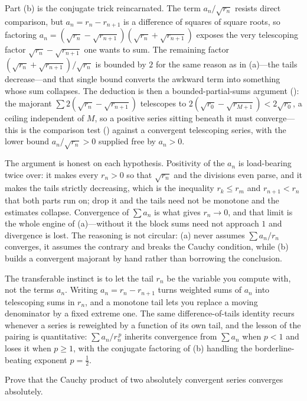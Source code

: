 \documentclass[main.tex]{subfiles}
\begin{document}
\begin{Reflection}
Part (b) is the conjugate trick reincarnated. The term $a_n/\sqrt{r_n}$ resists direct comparison, but
$a_n=r_n-r_{n+1}$ is a difference of squares of square roots, so factoring
$a_n=(\sqrt{r_n}-\sqrt{r_{n+1}})(\sqrt{r_n}+\sqrt{r_{n+1}})$ exposes the very telescoping factor
$\sqrt{r_n}-\sqrt{r_{n+1}}$ one wants to sum. The remaining factor
$(\sqrt{r_n}+\sqrt{r_{n+1}})/\sqrt{r_n}$ is bounded by $2$ for the same reason as in (a)---the tails
decrease---and that single bound converts the awkward term into something whose sum collapses. The
deduction is then a bounded-partial-sums argument (): the majorant
$\sum 2(\sqrt{r_n}-\sqrt{r_{n+1}})$ telescopes to $2(\sqrt{r_0}-\sqrt{r_{M+1}})<2\sqrt{r_0}$, a ceiling
independent of $M$, so a positive series sitting beneath it must converge---this is the comparison test
() against a convergent telescoping series, with the lower bound $a_n/\sqrt{r_n}>0$
supplied free by $a_n>0$.

The argument is honest on each hypothesis. Positivity of the $a_n$ is load-bearing twice over: it makes
every $r_n>0$ so that $\sqrt{r_n}$ and the divisions even parse, and it makes the tails strictly
decreasing, which is the inequality $r_{k}\le r_m$ and $r_{n+1}<r_n$ that both parts run on; drop it and
the tails need not be monotone and the estimates collapse. Convergence of $\sum a_n$ is what gives
$r_n\to 0$, and that limit is the whole engine of (a)---without it the block sums need not approach $1$
and divergence is lost. The reasoning is not circular: (a) never assumes $\sum a_n/r_n$ converges, it
assumes the contrary and breaks the Cauchy condition, while (b) builds a convergent majorant by hand
rather than borrowing the conclusion.

The transferable instinct is to let the tail $r_n$ be the variable you compute with, not the terms
$a_n$. Writing $a_n=r_n-r_{n+1}$ turns weighted sums of $a_n$ into telescoping sums in $r_n$, and a
monotone tail lets you replace a moving denominator by a fixed extreme one. The same difference-of-tails
identity recurs whenever a series is reweighted by a function of its own tail, and the lesson of the
pairing is quantitative: $\sum a_n/r_n^{\,p}$ inherits convergence from $\sum a_n$ when $p<1$ and loses
it when $p\ge 1$, with the conjugate factoring of (b) handling the borderline-beating exponent $p=\tfrac12$.
\end{Reflection}

Prove that the Cauchy product of two absolutely convergent series converges absolutely.
\end{document}
